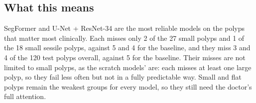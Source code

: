 \subsection{What this means}
\label{sec:failure-meaning}
SegFormer and U-Net + ResNet-34 are the most reliable models on the polyps that matter most clinically. Each
misses only 2 of the 27 small polyps and 1 of the 18 small sessile polyps, against 5 and 4 for the baseline, and
they miss 3 and 4 of the 120 test polyps overall, against 5 for the baseline. Their misses are not limited to
small polyps, as the scratch models' are: each misses at least one large polyp, so they fail less often but not
in a fully predictable way. Small and flat polyps remain the weakest groups for every model, so they still need
the doctor's full attention.
